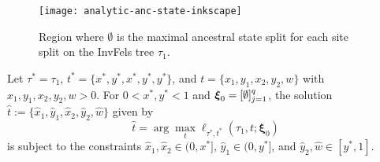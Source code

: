 \begin{figure}
\centering
\texttt{[image: analytic-anc-state-inkscape]}
\caption{
Region where $\emptyset$ is the maximal ancestral state split for each site split on the InvFels tree $\tau_1$.
}
\label{fig:max-anc-state}
\end{figure}

\begin{lemma}
Let $\tau^*=\tau_1$, $t^*=\{x^*, y^*, x^*, y^*, y^*\}$, and $t=\{x_1, y_1, x_2, y_2, w\}$ with $x_1, y_1, x_2, y_2, w > 0$.
For $0 < x^*, y^* < 1$ and $\boldsymbol\xi_0 = [\emptyset]_{j=1}^q$, the solution $\hat{t} := \{\hat{x}_1,\hat{y}_1,\hat{x}_2,\hat{y}_2,\hat{w}\}$ given by
\[
\hat{t} = \arg\max_t \ell_{\tau^*, t^*}(\tau_1, t; \boldsymbol\xi_0)
\]
is subject to the constraints $\hat{x}_1,\hat{x}_2 \in (0, x^*]$, $\hat{y}_1 \in (0, y^*]$, and $\hat{y}_2,\hat{w} \in [y^*, 1]$.
\label{lemma:bounds}
\end{lemma}

